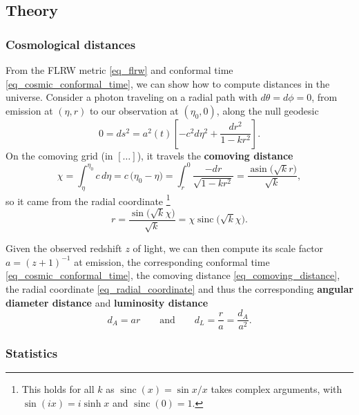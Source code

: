 \documentclass[10pt,a4paper]{article}
\DeclareMathOperator{\asin}{asin}
\DeclareMathOperator{\sinc}{sinc}
\begin{document}
\subsection{Theory}

\subsubsection{Cosmological distances}

From the FLRW metric \eqref{eq_flrw} and conformal time \eqref{eq_cosmic_conformal_time},
we can show how to compute distances in the universe.
Consider a photon traveling on a radial path with $d\theta = d\phi = 0$,
from emission at $(\eta,r)$ to our observation at $(\eta_0, 0)$,
along the null geodesic
\begin{equation*}
	0 = ds^2 = a^2(t) \left[ -c^2 d\eta^2 + \frac{dr^2}{1-kr^2} \right].
\end{equation*}
On the comoving grid (in $[\ldots]$), it travels the \textbf{comoving distance}
\begin{equation}
	\chi = \int_{\eta}^{\eta_0} c \, d\eta = c \, \big(\eta_0 - \eta\big) = \int_r^0 \frac{-dr}{\sqrt{1-kr^2}} = \frac{\asin\big(\sqrt{k}r\big)}{\sqrt{k}},
\label{eq_comoving_distance}
\end{equation}
so it came from the radial coordinate%
\footnote{This holds for all $k$ as $\sinc(x) = \sin x / x$ takes complex arguments, with $\sin(ix) = i \sinh x$ and $\sinc(0) = 1$.}
\begin{equation}
	r = \frac{\sin\Big(\sqrt{k}\chi\Big)}{\sqrt{k}} = \chi \sinc\Big(\sqrt{k}\chi\Big).
\label{eq_radial_coordinate}
\end{equation}

Given the observed redshift $z$ of light,
we can then compute its scale factor $a = (z+1)^{-1}$ at emission,
the corresponding conformal time \eqref{eq_cosmic_conformal_time},
the comoving distance \eqref{eq_comoving_distance}, the radial coordinate \eqref{eq_radial_coordinate}
and thus the corresponding \textbf{angular diameter distance} and \textbf{luminosity distance}
\begin{equation}
	d_A = a r
	\qquad \text{and} \qquad
	d_L = \frac{r}{a} = \frac{d_A}{a^2}.
\label{eq_distances}
\end{equation}

\subsubsection{Statistics}
\end{document}
